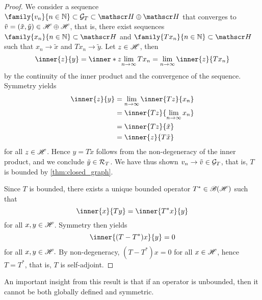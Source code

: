 \begin{proof}
    We consider a sequence \(\family{v_n}{n \in \mathbb{N}} \subset \graph{T} \subset \hilbert \oplus \hilbert\) that converges to \(\tilde{v} = (\tilde{x}, \tilde{y}) \in \mathscr{H}\oplus\mathscr{H}\), that is, there exist sequences \(\family{x_n}{n \in \mathbb{N}} \subset \hilbert\) and \(\family{Tx_n}{n \in \mathbb{N}} \subset \hilbert\) such that \(x_n \to \tilde{x}\) and \(Tx_n \to \tilde{y}\). Let \(z \in \mathscr{H}\), then
    \begin{equation*}
        \inner{z}{y} = \inner*{z}{\lim_{n \to \infty}{Tx_n}} = \lim_{n\to \infty}{\inner{z}{Tx_n}}
    \end{equation*}
    by the continuity of the inner product and the convergence of the sequence. Symmetry yields
    \begin{align*}
        \inner{z}{y} &= \lim_{n\to\infty}{\inner{Tz}{x_n}} \\&= \inner{Tz}{\lim_{n\to\infty}{x_n}} \\&= \inner{Tz}{\tilde{x}}\\
                     &= \inner{z}{T\tilde{x}}
    \end{align*}
    for all \(z \in \mathscr{H}\). Hence \(y = T\tilde{x}\) follows from the non-degeneracy of the inner product, and we conclude \(\tilde{y} \in \mathcal{R}_{T}\). We have thus shown \(v_n \to \tilde{v} \in \mathcal{G}_{T}\), that is, \(T\) is bounded by \cref{thm:closed_graph}.

    Since \(T\) is bounded, there exists a unique bounded operator \(T^* \in \mathscr{B}(\mathscr{H})\) such that
    \begin{equation*}
        \inner{x}{Ty} = \inner{T^*x}{y}
    \end{equation*}
    for all \(x, y \in \mathscr{H}\). Symmetry then yields
    \begin{equation*}
        \inner{(T - T^*)x}{y} = 0
    \end{equation*}
    for all \(x, y \in \mathscr{H}.\) By non-degeneracy, \((T - T^*)x = 0\) for all \(x \in \mathscr{H}\), hence \(T = T^*\), that is, \(T\) is self-adjoint.
\end{proof}
An important insight from this result is that if an operator is unbounded, then it cannot be both globally defined and symmetric.

